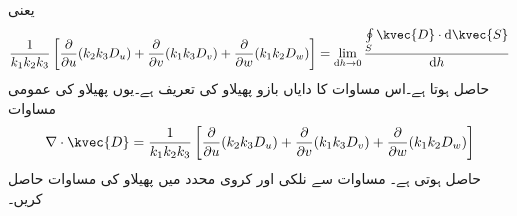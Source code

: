 یعنی
\begin{align*}
\frac{1}{k_1 k_2 k_3}\left[\frac{\partial }{\partial u} ( k_2 k_3  D_{u})+\frac{\partial }{\partial v} ( k_1 k_3  D_{v})+\frac{\partial }{\partial w} ( k_1 k_2  D_{w}) \right] =\lim_{\dif h \to 0}\frac{\oint\limits_{S} \kvec{D} \cdot \dif \kvec{S}}{\dif h}
\end{align*}
حاصل ہوتا ہے۔اس مساوات کا دایاں بازو پھیلاو کی تعریف ہے۔یوں پھیلاو کی عمومی مساوات
\begin{align}\label{مساوات_گاوس_پھیلاو_کی_عمومی_مساوات}
\nabla \cdot \kvec{D}=\frac{1}{k_1 k_2 k_3}\left[\frac{\partial }{\partial u} ( k_2 k_3  D_{u})+\frac{\partial }{\partial v} ( k_1 k_3  D_{v})+\frac{\partial }{\partial w} ( k_1 k_2  D_{w}) \right] 
\end{align}
حاصل ہوتی ہے۔
مساوات  سے  نلکی اور کروی محدد میں پھیلاو کی مساوات حاصل کریں۔

